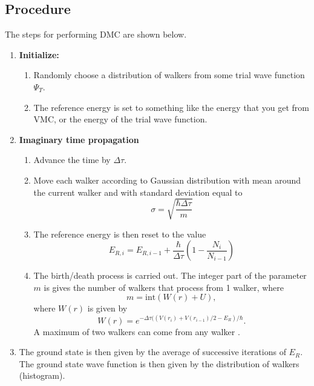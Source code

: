 \subsection*{Procedure}
The steps for performing DMC are shown below.
\begin{enumerate}
\item \textbf{Initialize:}
  \begin{enumerate}
  \item Randomly choose a distribution of walkers from some trial wave function $\Psi_T$.
  \item The reference energy is set to something like the energy that you get from VMC, or the energy of the trial wave function.
  \end{enumerate}

\item \textbf{Imaginary time propagation}
  \begin{enumerate}
  \item Advance the time by $\Delta \tau$.
  \item Move each walker according to Gaussian distribution with mean around the current walker and with standard deviation equal to
    \begin{equation}
      \sigma = \sqrt{\frac{\hbar \Delta \tau}{m}}
    \end{equation}
  \item The reference energy is then reset to the value
    \begin{equation}
      E_{R,i} = E_{R,i-1} + \frac{\hbar}{\Delta \tau} \left( 1-\frac{N_i}{N_{i-1}}\right)
    \end{equation}
  \item The birth/death process is carried out. The integer part of the parameter $m$ is gives the number of walkers that process from 1 walker, where
    \begin{equation}
      m = \mathrm{int} (W(r)+U),
    \end{equation}
    where $W(r)$ is given by
    \begin{equation}
      W(r) = e^{-\Delta\tau((V(r_i)+V(r_{i-1})/2 - E_R)/\hbar}.
    \end{equation}
    A maximum of two walkers can come from any walker \cite{kosztin1996}.
  \end{enumerate}

\item The ground state is then given by the average of successive iterations of $E_R$. The ground state wave function is then given by the distribution of walkers (histogram).
\end{enumerate}

